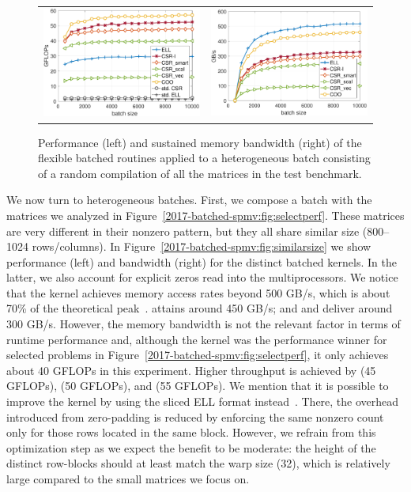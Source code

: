 \begin{figure}
\begin{center}
\begin{tabular}{cc}
\includegraphics[width=.45\columnwidth]{plots/RND_GFLOPS}
&
\includegraphics[width=.45\columnwidth]{plots/RND_BW}\\
\end{tabular}
\end{center}
\caption{Performance (left) and sustained memory bandwidth (right) of the 
flexible batched \spmv routines
applied to a heterogeneous batch consisting of a random compilation of all the 
matrices in the test benchmark.
}
\label{2017-batched-spmv:fig:allsize}
\end{figure}



We now turn to heterogeneous batches. First, we compose a batch with the 
matrices
we analyzed in Figure~\ref{2017-batched-spmv:fig:selectperf}. These matrices are very different 
in their nonzero pattern, 
but they all share similar size (800--1024 rows/columns).
In Figure~\ref{2017-batched-spmv:fig:similarsize} we show performance (left) and bandwidth 
(right) for the distinct 
batched \spmv kernels. In the latter, we also account for explicit zeros read 
into the multiprocessors.
We notice that the \ell kernel achieves memory access rates beyond 500 GB/s, 
which is about 70\% of the theoretical peak~\cite{P100}. 
\coo attains around 450 GB/s; and \csrsmart and \csri deliver around 300 GB/s.
However, the memory bandwidth is not the relevant factor in terms of 
runtime performance and, although the \ell kernel was the performance
winner for selected problems in Figure~\ref{2017-batched-spmv:fig:selectperf},
it only achieves about 40 GFLOPs in this experiment.
Higher throughput is achieved by \csrsmart (45 GFLOPs), \csri (50 GFLOPs),
and \coo (55 GFLOPs).
We mention that it is possible to improve the \ell kernel by 
using the sliced ELL format instead~\cite{sellpreport}.
There, the overhead introduced from zero-padding is reduced
by enforcing the same nonzero count only for those rows located in the same 
block.
However, we refrain from this optimization step as we expect the benefit to be 
moderate:
the height of the distinct row-blocks should at least match the warp size (32), 
which is relatively large compared to the small matrices we focus on.

